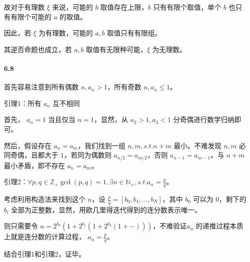 \documentclass[12pt, a4paper, oneside]{ctexart}
\begin{document}
	故对于有理数 $\xi$ 来说，可能的 $b$ 取值存在上限，$b$ 只有有限个取值，单个 $b$ 也只有有限个可能的 $a$ 的取值。
	
	因此，若 $\xi$ 为有理数，可能的 $a,b$ 取值只有有限组。
	
	其逆否命题也成立，若 $a,b$ 取值有无限种可能，$\xi$ 为无理数。
	
	\paragraph{6.8}
	
	首先容易注意到所有偶数 $n,a_n>1$，所有奇数 $n,a_n\leq 1$。
	
	引理1：{\kaishu 所有 $a_n$ 互不相同}
	
	首先， $a_n=1$ 当且仅当 $n=1$，显然，从 $a_2>1,a_3<1$ 分奇偶进行数学归纳即可。
	
	然后，假设存在 $a_n=a_m$，我们找到一组 $n,m, s.t. n+m$ 最小。不难发现 $n,m$ 必同奇偶，且都大于 $1$，若同为偶数则 $a_{n/2}=a_{m/2}$，否则 $a_{n-1}=a_{m-1}$。与 $n+m$ 最小矛盾，即不存在 $a_n=a_m$。
	
	引理2：{\kaishu $\forall p,q \in \mathbb Z_+ \gcd(p,q)=1,\exists n\in \mathbb N_+, s.t. a_n=\frac{p}q$}。
	
	考虑利用构造法来找到这个 $n$，设 $\frac{p}q = [b_0,b_1,\dots,b_N]$，其中 $b_0$ 可以为 $0$，剩下的 $b_i$ 全部为正整数，显然，用欧几里得迭代得到的连分数表示唯一。
	
	则只需要令 $n=2^{b_0}(1+2^{b_1}(1+2^{b_2}(1+\cdots)))$，不难验证$a_n$ 的递推过程本质上就是连分数的计算过程， $a_n = \frac{p}q$。
	
	结合引理1和引理2，证毕。
	
\end{document}

